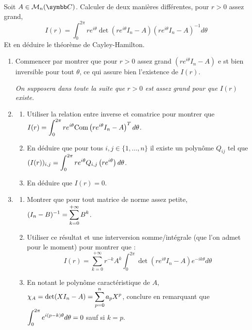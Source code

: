 \begin{exercice}
    Soit $A\in \mathcal{M}_{n}(\C)$. Calculer de deux manières différentes, pour $r>0$ assez grand,
    \[I(r)=\int_{0}^{2\pi}re^{i\theta} \det(re^{i\theta}I_{n}-A) (re^{i\theta}I_{n}-A)^{-1} d\theta\]
    Et en déduire le théorème de Cayley-Hamilton.
    \begin{enumerate}
        \item Commencer par montrer que pour $r>0$ assez grand $\left(re^{i\theta}I_{n}-A\right)$ e
            st bien inversible pour tout $\theta$, ce qui assure bien l'existence de $I(r)$.

            \textit{On supposera dans toute la suite que $r>0$ est assez grand pour que $I(r)$ existe.}
        \item 
        \begin{enumerate}
            \item Utiliser la relation entre inverse et comatrice pour montrer que 
                $\displaystyle I(r)=\int_{0}^{2\pi}re^{i\theta} \text{Com}\left(re^{i\theta}I_n-A\right)^{T} d\theta$.
            \item En déduire que pour tous $i,j\in\{1,\dots,n\}$ il existe un polynôme $Q_{ij}$ tel que 
                $\displaystyle (I(r))_{i,j}=\int_{0}^{2\pi}re^{i\theta}Q_{i,j}\left(re^{i\theta}\right) d\theta$.
            \item En déduire que $I(r)=0$.
        \end{enumerate}
        \item 
        \begin{enumerate}
            \item Montrer que pour tout matrice de norme assez petite, $\displaystyle (I_{n}-B)^{-1}=\sum_{k=0}^{+ \infty}B^{k}$.
            \item Utiliser ce résultat et une interversion somme/intégrale (que l'on admet pour le moment) pour montrer que :
                \[I(r)=\sum_{k=0}^{+ \infty}r^{-k}A^{k}\int_{0}^{2\pi}\det(re^{i\theta}I_{n}-A)e^{-ik\theta}d\theta\]
            \item En notant le polynôme caractéristique de $A$, $\displaystyle\chi_{A}=\det(XI_{n}-A)=\sum_{p=0}^{n}a_{p}X^{p}$, 
                conclure en remarquant que $\displaystyle \int_{0}^{2\pi}e^{i(p-k)\theta}d\theta=0$ sauf si $k=p$.
        \end{enumerate}
    \end{enumerate}
\end{exercice}

